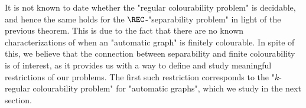 
It is not known to date whether the "regular colourability problem" is decidable, and hence 
the same holds for the $\REC$-"separability problem"
in light of the previous theorem. This is due to the fact that there are no known characterizations of when an "automatic graph" is finitely colourable. 
In spite of this, we believe that the connection between separability and finite colourability is of interest, as it provides us with a way to define and study meaningful 
restrictions of our problems. The first such restriction corresponds to the "$k$-regular colourability problem" for "automatic graphs", which we study in the next section. 

